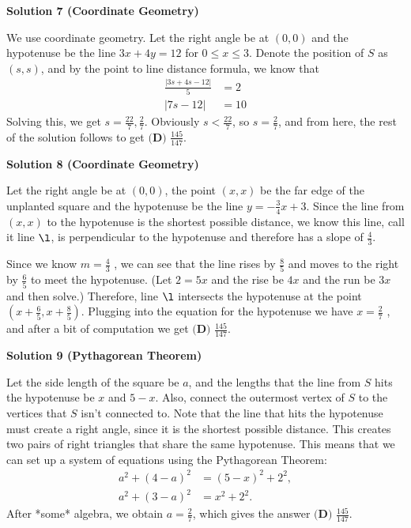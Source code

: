 \begin{enumerate}
 



\textbf{Solution 7 (Coordinate Geometry)}

We use coordinate geometry. Let the right angle be at $(0,0)$ and the hypotenuse be the line $3x+4y = 12$ for $0\le x\le 3$. Denote the position of $S$ as $(s,s)$, and by the point to line distance formula, we know that
 \begin{align*} \frac{|3s+4s-12|}{5} &= 2 \\ |7s-12| &= 10 \end{align*}
Solving this, we get $s=\frac{22}{7}, \frac{2}{7}$. Obviously $s<\frac{22}{7}$, so $s = \frac{2}{7}$, and from here, the rest of the solution follows to get $\boxed{\textbf{(D) } \frac{145}{147}}$.

 



\textbf{Solution 8 (Coordinate Geometry)}

Let the right angle be at $(0,0)$, the point $(x,x)$ be the far edge of the unplanted square and the hypotenuse be the line $y=-\frac{3}{4}x+3$. Since the line from $(x,x)$ to the hypotenuse is the shortest possible distance, we know this line, call it line $\l$, is perpendicular to the hypotenuse and therefore has a slope of $\frac{4}{3}$. 

 Since we know $m=\frac{4}{3}$ , we can see that the line rises by $\frac{8}{5}$ and moves to the right by $\frac{6}{5}$ to meet the hypotenuse. (Let $2 = 5x$ and the rise be $4x$ and the run be $3x$ and then solve.) Therefore, line $\l$ intersects the hypotenuse at the point $\left(x+\frac{6}{5}, x+\frac{8}{5}\right)$. Plugging into the equation for the hypotenuse we have $x=\frac{2}{7}$ , and after a bit of computation we get $\boxed{\textbf{(D) } \frac{145}{147}}$.

 



\textbf{Solution 9 (Pythagorean Theorem)}

Let the side length of the square be $a$, and the lengths that the line from $S$ hits the hypotenuse be $x$ and $5-x$. Also, connect the outermost vertex of $S$ to the vertices that $S$ isn't connected to. Note that the line that hits the hypotenuse must create a right angle, since it is the shortest possible distance. This creates two pairs of right triangles that share the same hypotenuse. This means that we can set up a system of equations using the Pythagorean Theorem: 
 \begin{align*} a^2+(4-a)^2&=(5-x)^2+2^2, \\ a^2+(3-a)^2&=x^2+2^2. \end{align*}
After *some* algebra, we obtain $a=\frac{2}{7}$, which gives the answer $\boxed{\textbf{(D) } \frac{145}{147}}$.


\end{enumerate}
